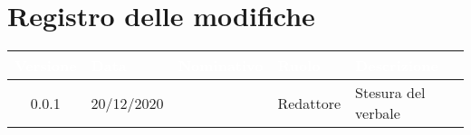 \section*{Registro delle modifiche}
{
\renewcommand{\arraystretch}{1.5}
\centering
\begin{longtable}{c C{2.6cm}  C{2.6cm} C{2.6cm} C{3.5cm}}
\textcolor{white}{\textbf{Versione}}&
\textcolor{white}{\textbf{Data}}&
\textcolor{white}{\textbf{Nominativo}}&
\textcolor{white}{\textbf{Ruolo}}&
\textcolor{white}{\textbf{Descrizione}}\\	
\endhead
		
0.0.1 & 20/12/2020 & \SP{} & Redattore & Stesura del verbale\\
		
\end{longtable}
}
